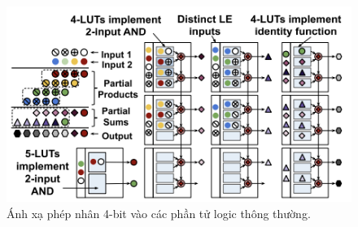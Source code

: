 \documentclass[a4paper]{article}
\begin{document}
\begin{figure} [!h]
    \centering
    \includegraphics[width=0.75\linewidth]{assets/fpga_12.png}
    \caption{Ánh xạ phép nhân 4-bit vào các phần tử logic thông thường.}
    \label{fig:fpga_12}
\end{figure}
\end{document}
